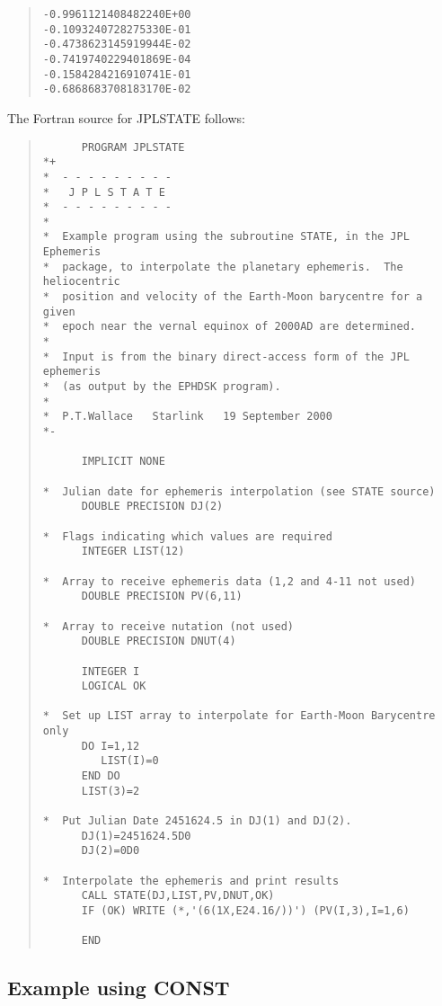 \documentclass[twoside,11pt]{article}
\newcommand{\xlabel}[1]{}
\renewcommand{\_}{\texttt{\symbol{95}}}
\newcommand{\latexonlysmall}{\small}
\newcommand{\latexonlysmall}{}
\begin{document}
\begin{quote}
\begin{verbatim}
-0.9961121408482240E+00
-0.1093240728275330E-01
-0.4738623145919944E-02
-0.7419740229401869E-04
-0.1584284216910741E-01
-0.6868683708183170E-02
\end{verbatim}
\end{quote}

The Fortran source for JPLSTATE follows:

\begin{quote}
\latexonlysmall
\begin{verbatim}
      PROGRAM JPLSTATE
*+
*  - - - - - - - - -
*   J P L S T A T E
*  - - - - - - - - -
*
*  Example program using the subroutine STATE, in the JPL Ephemeris
*  package, to interpolate the planetary ephemeris.  The heliocentric
*  position and velocity of the Earth-Moon barycentre for a given
*  epoch near the vernal equinox of 2000AD are determined.
*
*  Input is from the binary direct-access form of the JPL ephemeris
*  (as output by the EPHDSK program).
*
*  P.T.Wallace   Starlink   19 September 2000
*-

      IMPLICIT NONE

*  Julian date for ephemeris interpolation (see STATE source)
      DOUBLE PRECISION DJ(2)

*  Flags indicating which values are required
      INTEGER LIST(12)

*  Array to receive ephemeris data (1,2 and 4-11 not used)
      DOUBLE PRECISION PV(6,11)

*  Array to receive nutation (not used)
      DOUBLE PRECISION DNUT(4)

      INTEGER I
      LOGICAL OK

*  Set up LIST array to interpolate for Earth-Moon Barycentre only
      DO I=1,12
         LIST(I)=0
      END DO
      LIST(3)=2

*  Put Julian Date 2451624.5 in DJ(1) and DJ(2).
      DJ(1)=2451624.5D0
      DJ(2)=0D0

*  Interpolate the ephemeris and print results
      CALL STATE(DJ,LIST,PV,DNUT,OK)
      IF (OK) WRITE (*,'(6(1X,E24.16/))') (PV(I,3),I=1,6)

      END

\end{verbatim}
\end{quote}

\subsection{\xlabel{example_using_const}Example using CONST}
\label{example_using_const}
\end{document}
